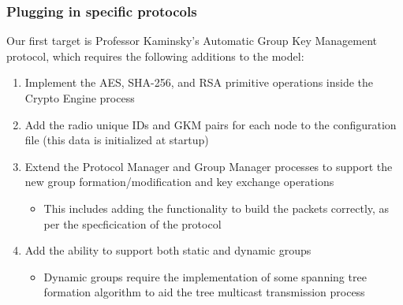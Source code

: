 \documentclass[handout]{beamer}
\begin{document}
\begin{frame}
 \frametitle{Plugging in specific protocols}
 
Our first target is Professor Kaminsky's Automatic Group Key Management protocol, which requires the following additions to the model:

\begin{enumerate}
 \item Implement the AES, SHA-256, and RSA primitive operations inside the Crypto Engine process
 \item Add the radio unique IDs and GKM pairs for each node to the configuration file (this data is initialized at startup)
 \item Extend the Protocol Manager and Group Manager processes to support the new group formation/modification and key exchange operations
 \begin{itemize}
  \item This includes adding the functionality to build the packets correctly, as per the specficication of the protocol
 \end{itemize}
 \item Add the ability to support both static and dynamic groups
 \begin{itemize}
  \item Dynamic groups require the implementation of some spanning tree formation algorithm to aid the tree multicast transmission process
 \end{itemize}
\end{enumerate}
 
\end{frame}
\end{document}
